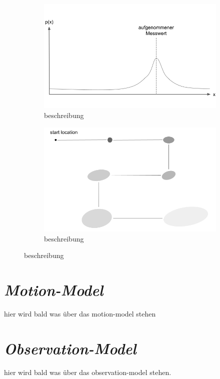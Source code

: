 \begin{figure}
  \begin{subfigure}[t]{.5\textwidth}
    \centering
    \includegraphics[width=.8\linewidth]{pic/vorwissen/3a_messunggauss.png}
    \caption{beschreibung}
    \label{fig:3a_messunggauss}
  \end{subfigure}\hfill
  \begin{subfigure}[t]{.5\textwidth}
    \centering
    \includegraphics[width=.8\linewidth]{pic/vorwissen/3b_growinguncertainty.png}
    \caption{beschreibung}
    \label{fig:3b_growing_uncertainty}
  \end{subfigure}
\end{figure}
\mbox{}



\section{\textit{Motion-Model}}\label{sec:Motion-Model}
hier wird bald was über das motion-model stehen

\section{\textit{Observation-Model}}\label{sec:Observation-Model}
hier wird bald was über das observation-model stehen.



